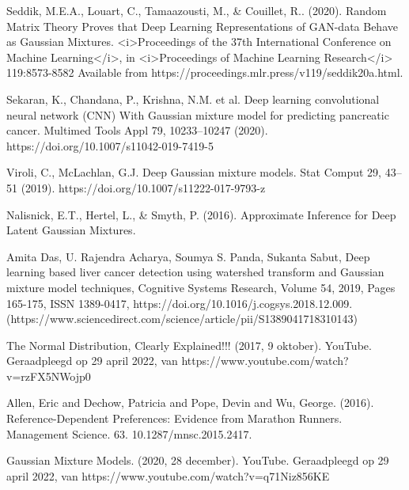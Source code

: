 \documentclass[conference]{IEEEtran}
\begin{document}
\begin{thebibliography}{00}
Seddik, M.E.A., Louart, C., Tamaazousti, M., \& Couillet, R.. (2020). Random Matrix Theory Proves that Deep Learning Representations of GAN-data Behave as Gaussian Mixtures. <i>Proceedings of the 37th International Conference on Machine Learning</i>, in <i>Proceedings of Machine Learning Research</i> 119:8573-8582 Available from https://proceedings.mlr.press/v119/seddik20a.html.

Sekaran, K., Chandana, P., Krishna, N.M. et al. Deep learning convolutional neural network (CNN) With Gaussian mixture model for predicting pancreatic cancer. Multimed Tools Appl 79, 10233–10247 (2020). https://doi.org/10.1007/s11042-019-7419-5

Viroli, C., McLachlan, G.J. Deep Gaussian mixture models. Stat Comput 29, 43–51 (2019). https://doi.org/10.1007/s11222-017-9793-z

Nalisnick, E.T., Hertel, L., \& Smyth, P. (2016). Approximate Inference for Deep Latent Gaussian Mixtures.

Amita Das, U. Rajendra Acharya, Soumya S. Panda, Sukanta Sabut,
Deep learning based liver cancer detection using watershed transform and Gaussian mixture model techniques,
Cognitive Systems Research,
Volume 54,
2019,
Pages 165-175,
ISSN 1389-0417,
https://doi.org/10.1016/j.cogsys.2018.12.009.
(https://www.sciencedirect.com/science/article/pii/S1389041718310143)

The Normal Distribution, Clearly Explained!!! (2017, 9 oktober). YouTube. Geraadpleegd op 29 april 2022, van https://www.youtube.com/watch?v=rzFX5NWojp0

Allen, Eric and Dechow, Patricia and Pope, Devin and Wu, George. (2016). Reference-Dependent Preferences: Evidence from Marathon Runners. Management Science. 63. 10.1287/mnsc.2015.2417. 

Gaussian Mixture Models. (2020, 28 december). YouTube. Geraadpleegd op 29 april 2022, van https://www.youtube.com/watch?v=q71Niz856KE

\end{thebibliography}
\end{document}
